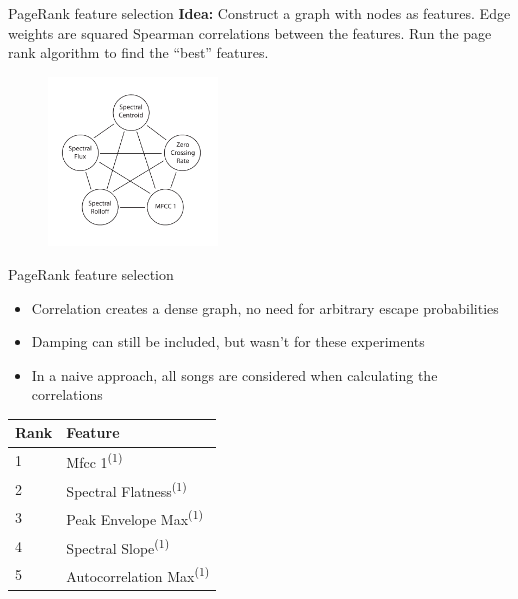 \documentclass[xcolor=dvipsnames,t]{beamer} %
\newcommand{\tss}[1]{\textsuperscript{#1}}
\begin{document}
\begin{frame}{PageRank feature selection}
\textbf{Idea:} Construct a graph with nodes as features.  Edge weights are squared Spearman correlations between the features. Run the page rank algorithm to find the ``best'' features.

\begin{figure}
\centering
\includegraphics[width=0.4\textwidth]{figures/featGraph.pdf}
\end{figure}
\end{frame}

\begin{frame}{PageRank feature selection}
\begin{itemize}
\item Correlation creates a dense graph, no need for arbitrary escape probabilities
\item Damping can still be included, but wasn't for these experiments
\item In a naive approach, all songs are considered when calculating the correlations
\end{itemize}

\begin{center}
\begin{tabular}{|l|l|}
\hline
Rank & Feature \\ \hline
1 & Mfcc 1\tss{(1)} \\ \hline
2 & Spectral Flatness\tss{(1)} \\ \hline
3 & Peak Envelope Max\tss{(1)} \\ \hline
4 & Spectral Slope\tss{(1)} \\ \hline
5 & Autocorrelation Max\tss{(1)} \\ \hline
\end{tabular}
\end{center}

\end{frame}
\end{document}

